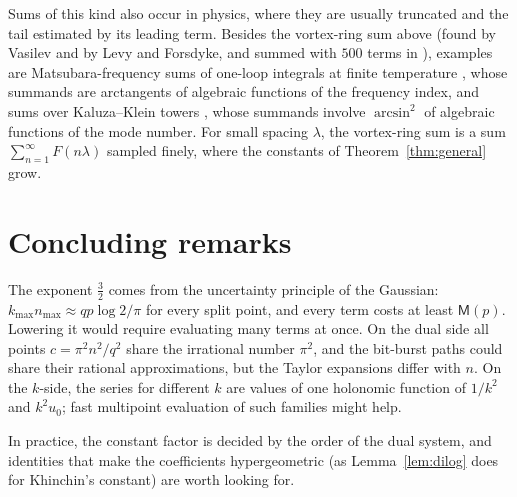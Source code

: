 \documentclass[11pt]{amsart}
\theoremstyle{definition}
\theoremstyle{remark}
\newcommand{\Mul}{\mathsf{M}}
\begin{document}
Sums of this kind also occur in physics, where they are usually truncated and the tail estimated by its leading
term. Besides the vortex-ring sum above (found by Vasilev and by Levy and Forsdyke, and summed with $500$ terms in
\cite{MS22}), examples are Matsubara-frequency sums of one-loop integrals at finite temperature \cite{HLS24}, whose
summands are arctangents of algebraic functions of the frequency index, and sums over Kaluza--Klein towers
\cite{Pet02}, whose summands involve $\arcsin^2$ of algebraic functions of the mode number. For small spacing $\lambda$,
the vortex-ring sum is a sum $\sum_{n=1}^{\infty} F(n\lambda)$ sampled finely, where the constants of Theorem~\ref{thm:general} grow.

\section{Concluding remarks}\label{sec:concl}

The exponent $\frac32$ comes from the uncertainty principle of the Gaussian: $k_{\max}n_{\max} \approx qp\log2/\pi$ for
every split point, and every term costs at least $\Mul(p)$. Lowering it would require evaluating many terms at once.
On the dual side all points $c = \pi^2n^2/q^2$ share the irrational number $\pi^2$, and the bit-burst paths could share
their rational approximations, but the Taylor expansions differ with $n$. On the $k$-side, the series for different $k$
are values of one holonomic function of $1/k^2$ and $k^2u_0$; fast multipoint evaluation of such families might help.

In practice, the constant factor is decided by the order of the dual system, and identities that make the
coefficients hypergeometric (as Lemma~\ref{lem:dilog} does for Khinchin's constant) are worth looking for.
\end{document}
